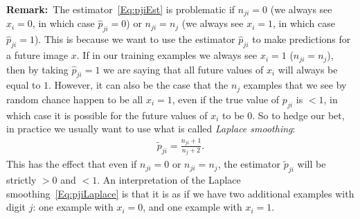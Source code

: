 \documentclass[11pt]{article}
\begin{document}
\medskip
{\bf Remark:}~The estimator~\eqref{Eq:pjiEst} is problematic if $n_{ji} = 0$ (we always see $x_i = 0$, in which case $\hat p_{ji} = 0$) or $n_{ji} = n_j$ (we always see $x_i = 1$, in which case $\hat p_{ji} = 1$). This is because we want to use the estimator $\hat p_{ji}$ to make predictions for a future image $x$. If in our training examples we always see $x_i = 1$ ($n_{ji} = n_j$), then by taking $\hat p_{ji} = 1$ we are saying that all future values of $x_i$ will always be equal to $1$. However, it can also be the case that the $n_j$ examples that we see by random chance happen to be all $x_i = 1$, even if the true value of $p_{ji}$ is $< 1$, in which case it is possible for the future values of $x_i$ to be $0$. So to hedge our bet, in practice we usually want to use what is called {\em Laplace smoothing}:
\begin{align}\label{Eq:pjiLaplace}
\tilde p_{ji} = \frac{n_{ji}+1}{n_j+2}.
\end{align}
This has the effect that even if $n_{ji} = 0$ or $n_{ji} = n_j$, the estimator $\tilde p_{ji}$ will be strictly $> 0$ and $< 1$. An interpretation of the Laplace smoothing~\eqref{Eq:pjiLaplace} is that it is as if we have two additional examples with digit $j$: one example with $x_i = 0$, and one example with $x_i = 1$.
\end{document}
